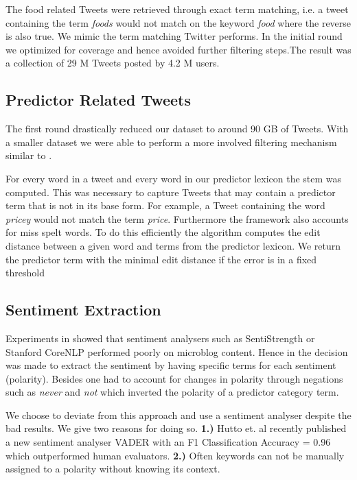 The food related Tweets were retrieved through exact term matching, i.e. a tweet containing the term \emph{foods} would not match on the keyword \emph {food} where the reverse is also true. We mimic the term matching Twitter performs. In the initial round we optimized for coverage and hence avoided further filtering steps.The result was a collection of 29 M Tweets posted by 4.2 M users. 

\subsection{Predictor Related Tweets}

The first round  drastically reduced our dataset to around 90 GB of Tweets. With a smaller dataset we were able to perform a more involved filtering mechanism similar to \cite{hum14}. 

For every word in a tweet and every word in our predictor lexicon the stem was computed. This was necessary to capture Tweets that may contain a predictor term that is not in its base form. For example, a Tweet containing the word \emph{pricey} would not match the term \emph{price}. Furthermore the framework also accounts for miss spelt words. To do this efficiently the algorithm computes the edit distance between a given word and terms from the predictor lexicon. We return the  predictor term with the minimal edit distance if the error is in a fixed threshold 

\subsection{Sentiment Extraction}

Experiments in \cite{hum14} showed that sentiment analysers such as SentiStrength \cite{sent10} or Stanford CoreNLP \cite{stanford2011} performed  poorly on microblog content. Hence in \cite{hum14} the decision was made to extract the sentiment by having specific terms for each sentiment (polarity). Besides one had to account for changes in polarity through negations such as \emph{never} and \emph{not} which inverted the polarity of a predictor category term. 

We choose to deviate from this approach and use a sentiment analyser despite the bad results. We give two reasons for doing so. \textbf{1.)} Hutto et. al recently published a new sentiment analyser VADER \cite{hutton14} with an F1 Classification Accuracy = 0.96 which outperformed human evaluators. \textbf{2.)} Often keywords can not be manually assigned to a polarity without knowing its context. 

